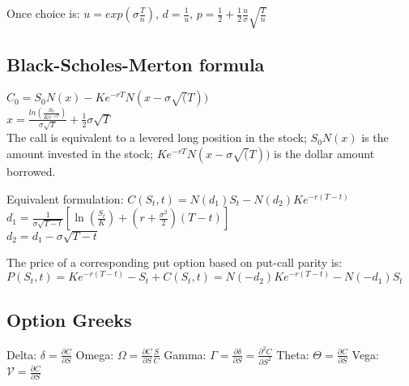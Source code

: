 Once choice is:  $u=exp(\sigma \frac{T}{n})$, $d=\frac{1}{u}$, $p=\frac{1}{2} + \frac{1}{2} \frac{u}{\sigma} \sqrt{\frac{T}{n}}$

\subsection*{Black-Scholes-Merton formula}

$C_0 = S_0 N(x) - K e^{-rT} N (x-\sigma \sqrt(T))$ \\
$x = \frac{ln(\frac{S_0}{K e^{-rT}})}{\sigma \sqrt{T}} + \frac{1}{2} \sigma \sqrt{T}$ \\

The call is equivalent to a levered long position in the stock;
 $S_0 N(x) $ is the amount invested in the stock;
$K e^{-rT} N (x-\sigma \sqrt(T))$ is the dollar amount borrowed.

Equivalent formulation:
$ C(S_t, t) = N(d_1)S_t - N(d_2)Ke^{-r(T - t)} $ \\
$ d_1 = \frac{1}{\sigma\sqrt{T - t}}\left[\ln\left(\frac{S_t}{K}\right) + \left(r + \frac{\sigma^2}{2}\right)(T - t)\right] $\\
$ d_2 = d_1 - \sigma\sqrt{T - t} $ 

The price of a corresponding put option based on put-call parity  is:
$ P(S_t, t) = Ke^{-r(T - t)} - S_t + C(S_t, t) =  N(-d_2) Ke^{-r(T - t)} - N(-d_1) S_t $

\subsection*{Option Greeks}

Delta: $\delta = \frac{\partial C}{\partial S}$
Omega: $\Omega = \frac{\partial C}{\partial S} \frac{S}{C}$
Gamma: $\Gamma = \frac{\partial \delta}{\partial S} = \frac{\partial^2 C}{\partial S^2} $
Theta: $\Theta = \frac{\partial C}{\partial S}$
Vega:  $\mathcal{V} = \frac{\partial C}{\partial S}$
